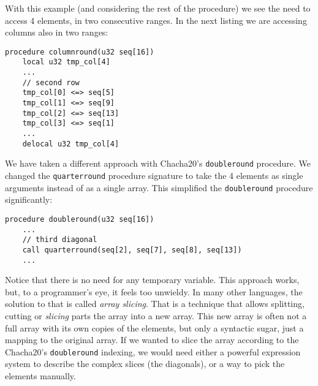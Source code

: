 \documentclass[a4paper,10pt,openright]{memoir}
\newcommand{\term}[1]{\textit{#1}}
\newcommand{\code}[1]{\texttt{#1}}
\begin{document}
With this example (and considering the rest of the procedure) we see 
the need to access 4 elements, in two consecutive ranges. In the next 
listing we are accessing columns also in two ranges:

\begin{lstlisting}[language=Janus]
procedure columnround(u32 seq[16])
	local u32 tmp_col[4]
	...
	// second row
	tmp_col[0] <=> seq[5]
	tmp_col[1] <=> seq[9]
	tmp_col[2] <=> seq[13]
	tmp_col[3] <=> seq[1]
	...
	delocal u32 tmp_col[4]
\end{lstlisting}

We have taken a different approach with Chacha20's \code{doubleround} 
procedure. We changed the \code{quarterround} procedure signature to 
take the 4 elements as single arguments instead of as a single array. 
This simplified the \code{doubleround} procedure significantly:

\begin{lstlisting}[language=Janus]
procedure doubleround(u32 seq[16])
	...
	// third diagonal
	call quarterround(seq[2], seq[7], seq[8], seq[13])
	...
\end{lstlisting}

Notice that there is no need for any temporary variable. This approach 
works, but, to a programmer's eye, it feels too unwieldy. In many other 
languages, the solution to that is called \term{array slicing}. That is 
a technique that allows splitting, cutting or \term{slicing} parts the 
array into a new array. This new array is often not a full array with 
its own copies of the elements, but only a syntactic sugar, just a 
mapping to the original array. If we wanted to slice the array 
according to the Chacha20's \code{doubleround} indexing, we would need 
either a powerful expression system to describe the complex slices (the 
diagonals), or a way to pick the elements manually.

\end{document}

